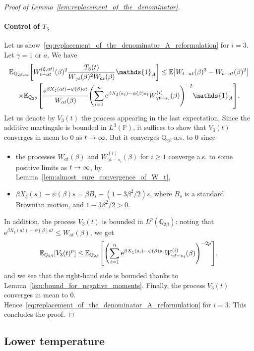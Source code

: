 \documentclass[10pt]{amsart}
\theoremstyle{definition}\newtheorem{defi}[theo]{Definition}\newtheorem{rema}[theo]{Remark}\newtheorem{exam}[theo]{Example}\newtheorem{exem}[theo]{Example}\newtheorem{nota}[theo]{Notation}
\newcommand{\e}{\mathrm{e}}
\newcommand{\E}{\mathbb{E}}
\renewcommand{\P}{\mathbb{P}}
\newcommand{\Q}{\mathbb{Q}}
\newcommand\1{\mathds{1}}
\let\originalleft\left
\let\originalright\right
\renewcommand{\left}{\mathopen{}\mathclose\bgroup\originalleft}
\renewcommand{\right}{\aftergroup\egroup\originalright}
\renewcommand*{\to}{\mathchoice{\longrightarrow}{\rightarrow}{\rightarrow}{\rightarrow}}
\begin{document}
\begin{proof}[Proof of Lemma~\ref{lem:replacement_of_the_denominator}]
\paragraph*{Control of $T_3$}
Let us show~\eqref{eq:replacement_of_the_denominator_A_reformulation} for $i = 3$. Let $\gamma = 1 \text{ or } a$. We have
\begin{multline*}
\E_{\Q_{2\beta, at}} \left[W_{t - at}^{(\xi, at)}(\beta)^2 \frac{T_3(t)}{W_{\gamma t}(\beta)^2 W_{at}(\beta)} \1_A \right]  \leq \E \left| W_{t - at}(\beta)^3 - W_{t - at}(\beta)^2 \right|  \\
\times \E_{\Q_{2\beta}} \left[\frac{\e^{\beta X_\xi(at) - \psi(\beta) at}}{W_{at}(\beta)} \left(\sum_{i = 1}^n \e^{\beta X_\xi(s_i) - \psi(\beta)s_i} W_{\gamma t - s_i}^{(i)}(\beta) \right)^{-2} \1_A \right].
\end{multline*}
Let us denote by $V_3(t)$ the process appearing in the last expectation. Since the additive martingale is bounded in $L^3(\P)$, it suffices to show that $V_3(t)$ converges in mean to $0$ as $t \to \infty$. But it converges $\Q_{2\beta}$-a.s. to $0$ since
\begin{itemize}
\item the processes $W_{at}(\beta)$ and $W_{\gamma t - s_i}^{(i)}(\beta)$ for $i \geq 1$ converge a.s. to some positive limits as $t \to \infty$, by Lemma~\ref{lem:almost_sure_convergence_of_W_t},
\item $\beta X_\xi(s) - \psi(\beta)s = \beta B_s - (1 - 3\beta^2/2)s$, where $B_s$ is a standard Brownian motion, and $1 - 3\beta^2/2>0$.
\end{itemize}
In addition, the process $V_3(t)$ is bounded in $L^p(\Q_{2\beta})$: noting that $\e^{\beta X_\xi(at) - \psi(\beta) at} \leq W_{at}(\beta)$, we get
\begin{equation*}
\E_{\Q_{2\beta}} \left[V_3(t)^p \right] \leq \E_{\Q_{2\beta}} \left[\left(\sum_{i = 1}^n \e^{\beta X_\xi(s_i) - \psi(\beta)s_i} W_{\gamma t - s_i}^{(i)}(\beta) \right)^{-2p} \right],
\end{equation*}
and we see that the right-hand side is bounded thanks to Lemma~\ref{lem:bound_for_negative_moments}. Finally, the process $V_3(t)$ converges in mean to $0$. Hence~\eqref{eq:replacement_of_the_denominator_A_reformulation} for $i = 3$. This concludes the proof.
\end{proof}

\subsection{Lower temperature}
\end{document}
